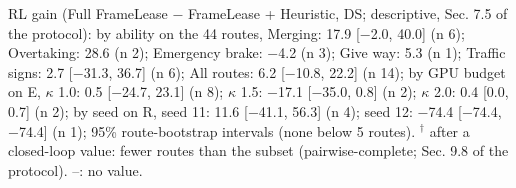 \begin{table}[t]
{RL gain (Full FrameLease $-$ FrameLease + Heuristic, DS; descriptive, Sec. 7.5 of the protocol): by ability on the 44 routes, Merging: 17.9 [$-$2.0, 40.0] (n 6); Overtaking: 28.6 (n 2); Emergency brake: $-$4.2 (n 3); Give way: 5.3 (n 1); Traffic signs: 2.7 [$-$31.3, 36.7] (n 6); All routes: 6.2 [$-$10.8, 22.2] (n 14); by GPU budget on E, $\kappa$ 1.0: 0.5 [$-$24.7, 23.1] (n 8); $\kappa$ 1.5: $-$17.1 [$-$35.0, 0.8] (n 2); $\kappa$ 2.0: 0.4 [0.0, 0.7] (n 2); by seed on R, seed 11: 11.6 [$-$41.1, 56.3] (n 4); seed 12: $-$74.4 [$-$74.4, $-$74.4] (n 1); 95\% route-bootstrap intervals (none below 5 routes). 
$^\dagger$ after a closed-loop value: fewer routes than the subset (pairwise-complete; Sec. 9.8 of the protocol). --: no value.
}
\end{table}
